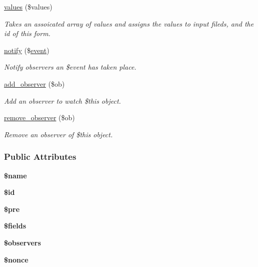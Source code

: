 \begin{DoxyCompactItemize}
\hyperlink{classforms_ad66e3f3a4d5332bbd15e53680930d786}{values} (\$values)
\begin{DoxyCompactList}\small\item\em Takes an assoicated array of values and assigns the values to input fileds, and the id of this form. \end{DoxyCompactList}\item 
\hyperlink{classforms_a82bc2b5e603ecd535f362c3dfdcae96e}{notify} (\$\hyperlink{classevent}{event})
\begin{DoxyCompactList}\small\item\em Notify observers an \$event has taken place. \end{DoxyCompactList}\item 
\hyperlink{classforms_a6c88ab2728699cc06ba8110b1f5aacbc}{add\-\_\-observer} (\$ob)
\begin{DoxyCompactList}\small\item\em Add an observer to watch \$this object. \end{DoxyCompactList}\item 
\hyperlink{classforms_af5c72c905909819f8824958c2faa015d}{remove\-\_\-observer} (\$ob)
\begin{DoxyCompactList}\small\item\em Remove an observer of \$this object. \end{DoxyCompactList}\end{DoxyCompactItemize}
\subsubsection*{Public Attributes}
\begin{DoxyCompactItemize}
\item 
\hypertarget{classforms_aa84609327e0f9bdf2ba799c8cd2268fd}{{\bfseries \$name}}\label{classforms_aa84609327e0f9bdf2ba799c8cd2268fd}

\item 
\hypertarget{classforms_a43144384180122ef4434845671a45e4c}{{\bfseries \$id}}\label{classforms_a43144384180122ef4434845671a45e4c}

\item 
\hypertarget{classforms_a55665dfe896e78efdfd33a650f6e2d7c}{{\bfseries \$pre}}\label{classforms_a55665dfe896e78efdfd33a650f6e2d7c}

\item 
\hypertarget{classforms_a4df40ac2adbfb971665ab358fc8954b5}{{\bfseries \$fields}}\label{classforms_a4df40ac2adbfb971665ab358fc8954b5}

\item 
\hypertarget{classforms_aebf137dbe732b7eee3786e3b1ec24535}{{\bfseries \$observers}}\label{classforms_aebf137dbe732b7eee3786e3b1ec24535}

\item 
\hypertarget{classforms_a6d215f823bedee39a37a80d1bd8a16f5}{{\bfseries \$nonce}}\label{classforms_a6d215f823bedee39a37a80d1bd8a16f5}

\end{DoxyCompactItemize}



